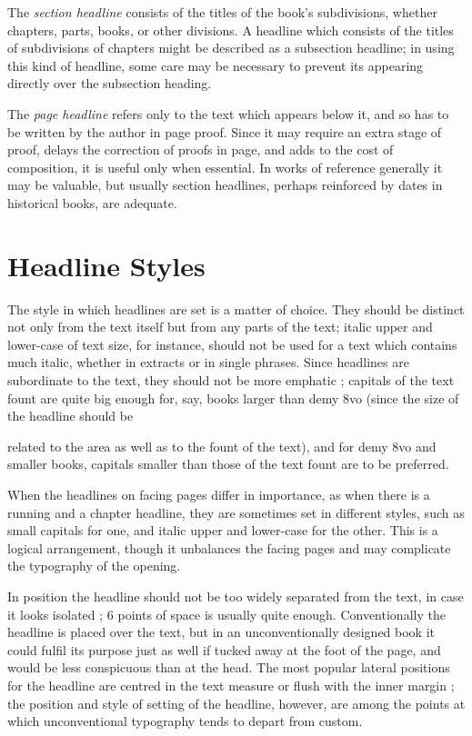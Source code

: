 The \emph{section headline} consists of the titles of the book's subdivisions,
whether chapters, parts, books, or other divisions. A headline which
consists of the titles of subdivisions of chapters might be described as a
subsection headline; in using this kind of headline, some care may be
necessary to prevent its appearing directly over the subsection heading.

The \emph{page headline} refers only to the text which appears below it, and
so has to be written by the author in page proof. Since it may require an
extra stage of proof, delays the correction of proofs in page, and adds to
the cost of composition, it is useful only when essential. In works of
reference generally it may be valuable, but usually section headlines, perhaps
reinforced by dates in historical books, are adequate.

\section{Headline Styles}

The style in which headlines are set is a matter of choice. They should
be distinct not only from the text itself but from any parts of the text;
italic upper and lower-case of text size, for instance, should not be used
for a text which contains much italic, whether in extracts or in single
phrases. Since headlines are subordinate to the text, they should not be
more emphatic ; capitals of the text fount are quite big enough for, say,
books larger than demy 8vo (since the size of the headline should be

related to the area as well as to the fount of the text), and for demy 8vo and
smaller books, capitals smaller than those of the text fount are to be
preferred.

When the headlines on facing pages differ in importance, as when there
is a running and a chapter headline, they are sometimes set in different
styles, such as small capitals for one, and italic upper and lower-case for
the other. This is a logical arrangement, though it unbalances the facing
pages and may complicate the typography of the opening.

In position the headline should not be too widely separated from the
text, in case it looks isolated ; 6 points of space is usually quite enough.
Conventionally the headline is placed over the text, but in an unconventionally
designed book it could fulfil its purpose just as well if tucked away
at the foot of the page, and would be less conspicuous than at the head.
The most popular lateral positions for the headline are centred in the text
measure or flush with the inner margin ; the position and style of setting
of the headline, however, are among the points at which unconventional
typography tends to depart from custom.

